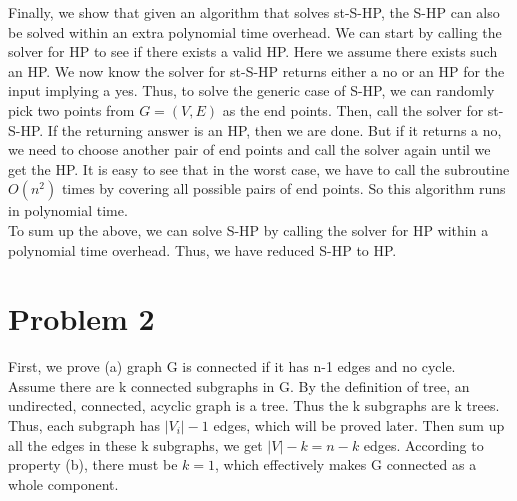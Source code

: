 \documentclass[titlepage, paper=a4, fontsize=11pt]{scrartcl} %
\numberwithin{equation}{section} %
\numberwithin{figure}{section} %
\numberwithin{table}{section} %
\begin{document}
Finally, we show that given an algorithm that solves st-S-HP, the S-HP can also be solved within an extra polynomial time overhead. We can start by calling the solver for HP to see if there exists a valid HP. Here we assume there exists such an HP. We now know the solver for st-S-HP returns either a no or an HP for the input implying a yes. Thus, to solve the generic case of S-HP, we can randomly pick two points from $G=(V,E)$ as the end points. Then, call the solver for st-S-HP. If the returning answer is an HP, then we are done. But if it returns a no, we need to choose another pair of end points and call the solver again until we get the HP. It is easy to see that in the worst case, we have to call the subroutine $O(n^2)$ times by covering all possible pairs of end points. So this algorithm runs in polynomial time. \\

To sum up the above, we can solve S-HP by calling the solver for HP within a polynomial time overhead. Thus, we have reduced S-HP to HP.




\section*{Problem 2}
First, we prove (a) graph G is connected if it has n-1 edges and no cycle. \\
Assume there are k connected subgraphs in G. By the definition of tree, an undirected, connected, acyclic graph is a tree. Thus the k subgraphs are k trees. Thus, each subgraph has $|V_i|-1$ edges, which will be proved later. Then sum up all the edges in these k subgraphs, we get $|V|-k = n-k$ edges. According to property (b), there must be $k=1$, which effectively makes G connected as a whole component. \\
\end{document}
